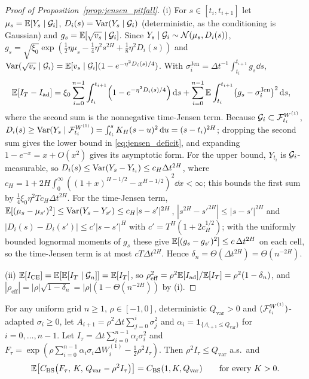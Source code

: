 \begin{proof}[Proof of Proposition~\ref{prop:jensen_pitfall}]
(i) For $s\in[t_i,t_{i+1}]$ let $\mu_s=\mathbb{E}[Y_s\mid\mathcal{G}_i]$, $D_i(s)=\operatorname{Var}(Y_s\mid\mathcal{G}_i)$ (deterministic, as the conditioning is Gaussian) and $g_s=\mathbb{E}[\sqrt{v_s}\mid\mathcal{G}_i]$. Since $Y_s\mid\mathcal{G}_i\sim\mathcal{N}(\mu_s,D_i(s))$, $g_s=\sqrt{\xi_0}\exp(\tfrac12\eta\mu_s-\tfrac14\eta^2s^{2H}+\tfrac18\eta^2D_i(s))$ and $\operatorname{Var}(\sqrt{v_s}\mid\mathcal{G}_i)=\mathbb{E}[v_s\mid\mathcal{G}_i](1-e^{-\eta^2D_i(s)/4})$. With $\sigma_i^{\mathrm{Jen}}=\Delta t^{-1}\int_{t_i}^{t_{i+1}}g_s\dd s$,
\[
  \begin{aligned}
  &\mathbb{E}[I_T-I_{\mathrm{ad}}]
  =\xi_0\sum_{i=0}^{n-1}\int_{t_i}^{t_{i+1}}\Bigl(1-e^{-\eta^2D_i(s)/4}\Bigr)\,\mathrm{d} s
   +\sum_{i=0}^{n-1}\mathbb{E}\int_{t_i}^{t_{i+1}}\bigl(g_s-\sigma_i^{\mathrm{Jen}}\bigr)^2\,\mathrm{d} s,
  \end{aligned}
\]
where the second sum is the nonnegative time-Jensen term. Because $\mathcal{G}_i\subset\mathcal{F}_{t_i}^{W^{(1)}}$, $D_i(s)\ge\operatorname{Var}(Y_s\mid\mathcal{F}_{t_i}^{W^{(1)}})=\int_{t_i}^sK_H(s-u)^2\,\mathrm{d} u=(s-t_i)^{2H}$; dropping the second sum gives the lower bound in \eqref{eq:jensen_deficit}, and expanding $1-e^{-x}=x+O(x^2)$ gives its asymptotic form. For the upper bound, $Y_{t_i}$ is $\mathcal{G}_i$-measurable, so $D_i(s)\le\operatorname{Var}(Y_s-Y_{t_i})\le c_H\Delta t^{2H}$, where $c_H=1+2H\int_0^\infty((1+x)^{H-1/2}-x^{H-1/2})^2\dd x<\infty$; this bounds the first sum by $\tfrac14\xi_0\eta^2Tc_H\Delta t^{2H}$. For the time-Jensen term, $\mathbb{E}[(\mu_s-\mu_{s'})^2]\le\operatorname{Var}(Y_s-Y_{s'})\le c_H|s-s'|^{2H}$, $|s^{2H}-s'^{2H}|\le|s-s'|^{2H}$ and $|D_i(s)-D_i(s')|\le c'|s-s'|^{H}$ with $c'=T^H(1+2c_H^{1/2})$; with the uniformly bounded lognormal moments of $g_s$ these give $\mathbb{E}[(g_s-g_{s'})^2]\le c\,\Delta t^{2H}$ on each cell, so the time-Jensen term is at most $cT\Delta t^{2H}$. Hence $\delta_n=\Theta(\Delta t^{2H})=\Theta(n^{-2H})$.

(ii) $\mathbb{E}[I_{\mathrm{CE}}]=\mathbb{E}[\mathbb{E}[I_T\mid\mathcal{G}_n]]=\mathbb{E}[I_T]$, so $\rho_{\mathrm{eff}}^2=\rho^2\mathbb{E}[I_{\mathrm{ad}}]/\mathbb{E}[I_T]=\rho^2(1-\delta_n)$, and $|\rho_{\mathrm{eff}}|=|\rho|\sqrt{1-\delta_n}=|\rho|(1-\Theta(n^{-2H}))$ by (i).
\end{proof}

\begin{lemma}
\label{lem:stopped_cv}
For any uniform grid $n\ge 1$, $\rho\in[-1,0]$, deterministic $Q_{\mathrm{var}}>0$ and $(\mathcal{F}_{t_i}^{W^{(1)}})$-adapted $\sigma_i\ge 0$, let $A_{i+1}=\rho^2\Delta t\sum_{j=0}^{i}\sigma_j^2$ and $\alpha_i=\mathbf{1}_{\{A_{i+1}\le Q_{\mathrm{var}}\}}$ for $i=0,\dots,n-1$. Let $I_\tau=\Delta t\sum_{i=0}^{n-1}\alpha_i\sigma_i^2$ and $F_\tau=\exp(\rho\sum_{i=0}^{n-1}\alpha_i\sigma_i\Delta W_i^{(1)}-\tfrac12\rho^2 I_\tau)$. Then $\rho^2 I_\tau\le Q_{\mathrm{var}}$ a.s.\ and
\[
  \begin{gathered}
  \mathbb{E}\!\left[C_{\mathrm{BS}}\!\left(F_\tau,\,K,\,Q_{\mathrm{var}}-\rho^2 I_\tau\right)\right]
  = C_{\mathrm{BS}}(1,K,Q_{\mathrm{var}})
  \qquad\text{for every }K>0.
  \end{gathered}
\]
\end{lemma}


